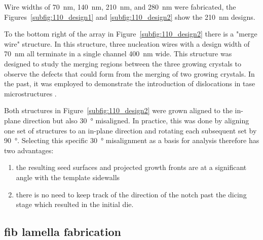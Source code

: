 Wire widths of \qty{70}{\nano\metre}, \qty{140}{\nano\metre}, \qty{210}{\nano\metre}, and \qty{280}{\nano\metre} were fabricated, the Figures~\ref{subfig:110_design1} and \ref{subfig:110_design2} show the \qty{210}{\nano\metre} designs.

To the bottom right of the array in Figure~\ref{subfig:110_design2} there is a "merge wire" structure. In this structure, three nucleation wires with a design width of \qty{70}{\nano\metre} all terminate in a single channel \qty{400}{\nano\metre} wide. This structure was designed to study the merging regions between the three growing crystals to observe the defects that could form from the merging of two growing crystals. In the past, it was employed to demonstrate the introduction of dislocations in \acs{tase} microstructures \cite{Mauthe2021}.

Both structures in Figure~\ref{subfig:110_design2} were grown aligned to the in-plane  direction but also \qty{30}{\degree} misaligned. In practice, this was done by aligning one set of structures to an in-plane  direction and rotating each subsequent set by \qty{90}{\degree}. Selecting this specific \qty{30}{\degree} misalignment as a basis for analysis therefore has two advantages:
\begin{enumerate}
    \item the resulting seed surfaces and projected growth fronts are at a significant angle with the template sidewalls
    \item there is no need to keep track of the direction of the notch past the dicing stage which resulted in the initial  die.
\end{enumerate}

\subsection{\texorpdfstring{\acs{fib} lamella fabrication}{FIB lamella fabrication}}

